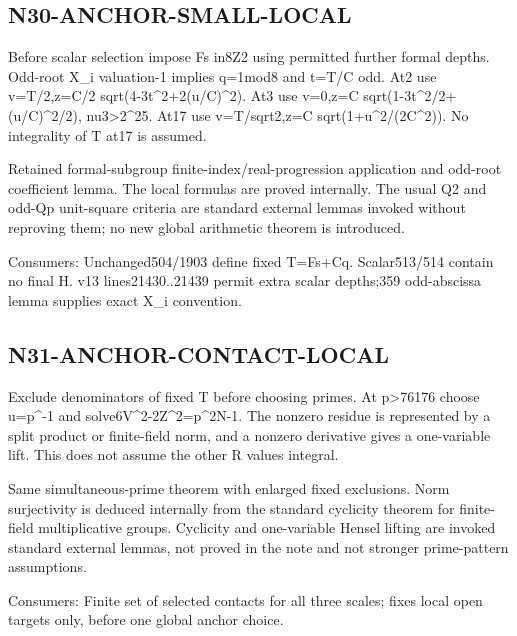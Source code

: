 \documentclass{article}
\begin{document}
\subsection{N30-ANCHOR-SMALL-LOCAL}
\label{outline:r4-n30-anchor-small-local}
Before scalar selection impose Fs in8Z2 using permitted further formal depths. Odd-root X\_i valuation-1 implies q=1mod8 and t=T/C odd. At2 use v=T/2,z=C/2 sqrt(4-3t\textasciicircum{}2+2(u/C)\textasciicircum{}2). At3 use v=0,z=C sqrt(1-3t\textasciicircum{}2/2+(u/C)\textasciicircum{}2/2), nu3>2\textasciicircum{}25. At17 use v=T/sqrt2,z=C sqrt(1+u\textasciicircum{}2/(2C\textasciicircum{}2)). No integrality of T at17 is assumed.
\par Retained formal-subgroup finite-index/real-progression application and odd-root coefficient lemma. The local formulas are proved internally. The usual Q2 and odd-Qp unit-square criteria are standard external lemmas invoked without reproving them; no new global arithmetic theorem is introduced.
\par Consumers: Unchanged504/1903 define fixed T=Fs+Cq. Scalar513/514 contain no final H. v13 lines21430..21439 permit extra scalar depths;359 odd-abscissa lemma supplies exact X\_i convention.
\subsection{N31-ANCHOR-CONTACT-LOCAL}
\label{outline:r4-n31-anchor-contact-local}
Exclude denominators of fixed T before choosing primes. At p>76176 choose u=p\textasciicircum{}-1 and solve6V\textasciicircum{}2-2Z\textasciicircum{}2=p\textasciicircum{}2N-1. The nonzero residue is represented by a split product or finite-field norm, and a nonzero derivative gives a one-variable lift. This does not assume the other R values integral.
\par Same simultaneous-prime theorem with enlarged fixed exclusions. Norm surjectivity is deduced internally from the standard cyclicity theorem for finite-field multiplicative groups. Cyclicity and one-variable Hensel lifting are invoked standard external lemmas, not proved in the note and not stronger prime-pattern assumptions.
\par Consumers: Finite set of selected contacts for all three scales; fixes local open targets only, before one global anchor choice.
\end{document}
